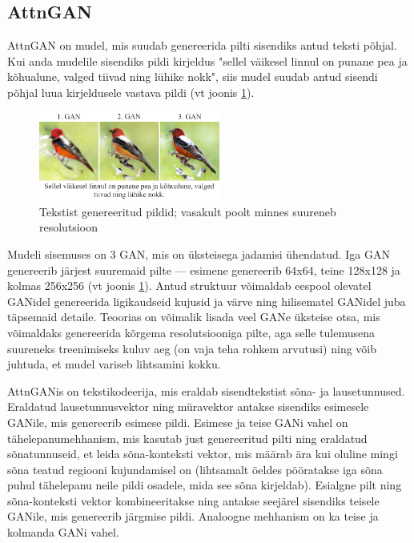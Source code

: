 \documentclass{vilgym}
\begin{document}
	\subsection{AttnGAN}

	AttnGAN on mudel, mis suudab genereerida pilti sisendiks antud teksti põhjal. Kui anda mudelile sisendiks pildi kirjeldus "sellel väikesel linnul on punane pea ja kõhualune, valged tiivad ning lühike nokk", siis mudel suudab antud sisendi põhjal luua kirjeldusele vastava pildi (vt joonis \ref{fig:attngan}).
	
	\begin{figure}
		\includegraphics[width=0.53\textwidth]{images/attngan.png}
		\caption{Tekstist genereeritud pildid; vasakult poolt minnes suureneb resolutsioon}
		\label{fig:attngan}
	\end{figure}

	Mudeli sisemuses on 3 GAN, mis on üksteisega jadamisi ühendatud. Iga GAN genereerib järjest suuremaid pilte --- esimene genereerib 64x64, teine 128x128 ja kolmas 256x256 (vt joonis \ref{fig:attngan}). Antud struktuur võimaldab eespool olevatel GANidel genereerida ligikaudseid kujusid ja värve ning hilisematel GANidel juba täpsemaid detaile. Teoorias on võimalik lisada veel GANe üksteise otsa, mis võimaldaks genereerida kõrgema resolutsiooniga pilte, aga selle tulemusena suureneks treenimiseks kuluv aeg (on vaja teha rohkem arvutusi) ning võib juhtuda, et mudel variseb lihtsamini kokku.

	AttnGANis on tekstikodeerija, mis eraldab sisendtekstist sõna- ja lausetunnused. Eraldatud lausetunnusvektor ning müravektor antakse sisendiks esimesele GANile, mis genereerib esimese pildi. Esimese ja teise GANi vahel on tähelepanumehhanism, mis kasutab just genereeritud pilti ning eraldatud sõnatunnuseid, et leida sõna-konteksti vektor, mis määrab ära kui oluline mingi sõna teatud regiooni kujundamisel on (lihtsamalt öeldes pööratakse iga sõna puhul tähelepanu neile pildi osadele, mida see sõna kirjeldab). Esialgne pilt ning sõna-konteksti vektor kombineeritakse ning antakse seejärel sisendiks teisele GANile, mis genereerib järgmise pildi. Analoogne mehhanism on ka teise ja kolmanda GANi vahel.
\end{document}
